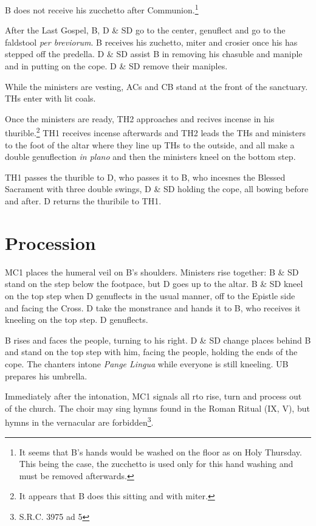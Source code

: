 \documentclass[letterpaper]{report}
\newcommand{\pbr}[0]{\textit{per breviorum}}
\begin{document}
{\rubric B does not receive his zucchetto after Communion.\footnote{It seems
that B's hands would be washed on the floor as on Holy Thursday. This being the
case, the zucchetto is used only for this hand washing and must be removed
afterwards.}

\rubric After the Last Gospel, B, D \& SD go to the center, genuflect and go to
the faldstool \pbr. B receives his zuchetto, miter and crosier once his has
stepped off the predella. D \& SD assist B in removing his chasuble and maniple
and in putting on the cope. D \& SD remove their maniples.

\rubric While the ministers are vesting, ACs and CB stand at the front of the
sanctuary. THs enter with lit coals.

\rubric Once the ministers are ready, TH2 approaches and recives incense in his
thurible.\footnote{It appears that B does this sitting and with miter.} TH1
receives incense afterwards and TH2 leads the THs and ministers to the foot of
the altar where they line up THs to the outside, and all make a double
genuflection \textit{in plano} and then the ministers kneel on the bottom step.

\rubric TH1 passes the thurible to D, who passes it to B, who incesnes the
Blessed Sacrament with three double swings, D \& SD holding the cope, all
bowing before and after. D returns the thuribile to TH1.

\section{Procession}

\rubric MC1 places the humeral veil on B's shoulders. Ministers rise together:
B \& SD stand on the step below the footpace, but D goes up to the altar. B \&
SD kneel on the top step when D genuflects in the usual manner, off to the
Epistle side and facing the Cross. D take the monstrance and hands it to B, who
receives it kneeling on the top step. D genuflects.

\rubric B rises and faces the people, turning to his right. D \& SD change
places behind B and stand on the top step with him, facing the people, holding
the ends of the cope. The chanters intone \textit{Pange Lingua} while everyone
is still kneeling. UB prepares his umbrella.

\rubric Immediately after the intonation, MC1 signals all rto rise, turn and
process out of the church. The choir may sing hymns found in the Roman Ritual
(IX, V), but hymns in the vernacular are forbidden\footnote{S.R.C. 3975 ad 5}.

}
\end{document}

